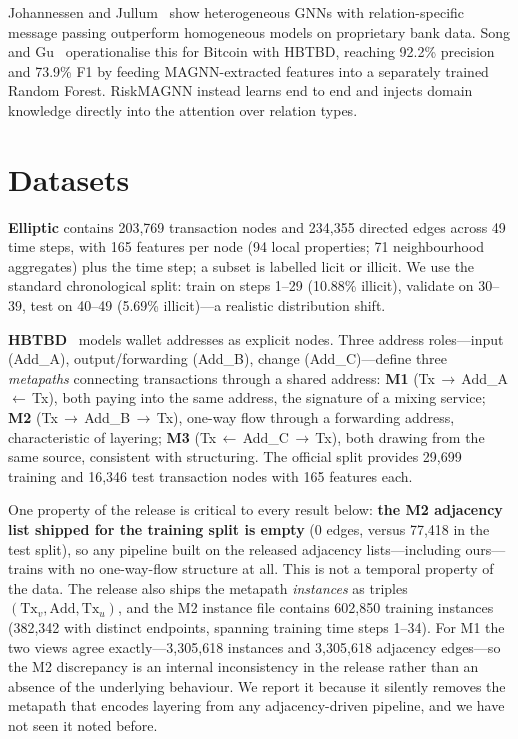 \documentclass[conference]{IEEEtran}
\begin{document}
Johannessen and Jullum~\cite{johannessen2025} show heterogeneous GNNs with
relation-specific message passing outperform homogeneous models on
proprietary bank data. Song and Gu~\cite{song2023} operationalise this for
Bitcoin with HBTBD, reaching 92.2\% precision and 73.9\% F1 by feeding
MAGNN-extracted features into a separately trained Random Forest. RiskMAGNN
instead learns end to end and injects domain knowledge directly into the
attention over relation types.

\section{Datasets}

\textbf{Elliptic} contains 203{,}769 transaction nodes and 234{,}355 directed
edges across 49 time steps, with 165 features per node (94 local properties;
71 neighbourhood aggregates) plus the time step; a subset is labelled licit
or illicit. We use the standard chronological split: train on steps 1--29
(10.88\% illicit), validate on 30--39, test on 40--49 (5.69\% illicit)---a
realistic distribution shift.

\textbf{HBTBD}~\cite{song2023} models wallet addresses as explicit nodes.
Three address roles---input (Add\_A), output/forwarding (Add\_B), change
(Add\_C)---define three \emph{metapaths} connecting transactions through a
shared address: \textbf{M1} (Tx\,$\rightarrow$\,Add\_A\,$\leftarrow$\,Tx),
both paying into the same address, the signature of a mixing service;
\textbf{M2} (Tx\,$\rightarrow$\,Add\_B\,$\rightarrow$\,Tx), one-way flow
through a forwarding address, characteristic of layering; \textbf{M3}
(Tx\,$\leftarrow$\,Add\_C\,$\rightarrow$\,Tx), both drawing from the same
source, consistent with structuring. The official split provides 29{,}699
training and 16{,}346 test transaction nodes with 165 features each.

One property of the release is critical to every result below:
\textbf{the M2 adjacency list shipped for the training split is empty}
(0 edges, versus 77{,}418 in the test split), so any pipeline built on the
released adjacency lists---including ours---trains with no one-way-flow
structure at all. This is not a temporal property of the data. The release
also ships the metapath \emph{instances} as triples
$(\text{Tx}_v,\text{Add},\text{Tx}_u)$, and the M2 instance file contains
602{,}850 training instances (382{,}342 with distinct endpoints, spanning
training time steps 1--34). For M1 the two views agree exactly---3{,}305{,}618
instances and 3{,}305{,}618 adjacency edges---so the M2 discrepancy is an
internal inconsistency in the release rather than an absence of the
underlying behaviour. We report it because it silently removes the metapath
that encodes layering from any adjacency-driven pipeline, and we have not
seen it noted before.
\end{document}
